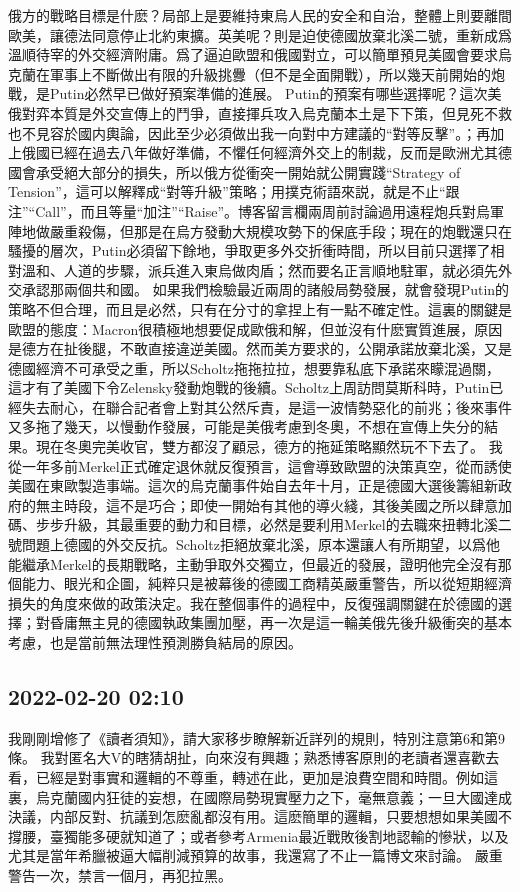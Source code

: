 \documentclass[twocolumn]{ctexart}
\begin{document}
俄方的戰略目標是什麽？局部上是要維持東烏人民的安全和自治，整體上則要離間歐美，讓德法同意停止北約東擴。英美呢？則是迫使德國放棄北溪二號，重新成爲溫順待宰的外交經濟附庸。爲了逼迫歐盟和俄國對立，可以簡單預見美國會要求烏克蘭在軍事上不斷做出有限的升級挑釁（但不是全面開戰），所以幾天前開始的炮戰，是Putin必然早已做好預案準備的進展。
Putin的預案有哪些選擇呢？這次美俄對弈本質是外交宣傳上的鬥爭，直接揮兵攻入烏克蘭本土是下下策，但見死不救也不見容於國内輿論，因此至少必須做出我一向對中方建議的“對等反擊”。；再加上俄國已經在過去八年做好準備，不懼任何經濟外交上的制裁，反而是歐洲尤其德國會承受絕大部分的損失，所以俄方從衝突一開始就公開實踐“Strategy of Tension”，這可以解釋成“對等升級”策略；用撲克術語來説，就是不止“跟注”“Call”，而且等量“加注”“Raise”。博客留言欄兩周前討論過用遠程炮兵對烏軍陣地做嚴重殺傷，但那是在烏方發動大規模攻勢下的保底手段；現在的炮戰還只在騷擾的層次，Putin必須留下餘地，爭取更多外交折衝時間，所以目前只選擇了相對溫和、人道的步驟，派兵進入東烏做肉盾；然而要名正言順地駐軍，就必須先外交承認那兩個共和國。
如果我們檢驗最近兩周的諸般局勢發展，就會發現Putin的策略不但合理，而且是必然，只有在分寸的拿捏上有一點不確定性。這裏的關鍵是歐盟的態度：Macron很積極地想要促成歐俄和解，但並沒有什麽實質進展，原因是德方在扯後腿，不敢直接違逆美國。然而美方要求的，公開承諾放棄北溪，又是德國經濟不可承受之重，所以Scholtz拖拖拉拉，想要靠私底下承諾來矇混過關，這才有了美國下令Zelensky發動炮戰的後續。Scholtz上周訪問莫斯科時，Putin已經失去耐心，在聯合記者會上對其公然斥責，是這一波情勢惡化的前兆；後來事件又多拖了幾天，以慢動作發展，可能是美俄考慮到冬奧，不想在宣傳上失分的結果。現在冬奧完美收官，雙方都沒了顧忌，德方的拖延策略顯然玩不下去了。
我從一年多前Merkel正式確定退休就反復預言，這會導致歐盟的決策真空，從而誘使美國在東歐製造事端。這次的烏克蘭事件始自去年十月，正是德國大選後籌組新政府的無主時段，這不是巧合；即使一開始有其他的導火綫，其後美國之所以肆意加碼、步步升級，其最重要的動力和目標，必然是要利用Merkel的去職來扭轉北溪二號問題上德國的外交反抗。Scholtz拒絕放棄北溪，原本還讓人有所期望，以爲他能繼承Merkel的長期戰略，主動爭取外交獨立，但最近的發展，證明他完全沒有那個能力、眼光和企圖，純粹只是被幕後的德國工商精英嚴重警告，所以從短期經濟損失的角度來做的政策決定。我在整個事件的過程中，反復强調關鍵在於德國的選擇；對昏庸無主見的德國執政集團加壓，再一次是這一輪美俄先後升級衝突的基本考慮，也是當前無法理性預測勝負結局的原因。
\subsection*{2022-02-20 02:10}

我剛剛增修了《讀者須知》，請大家移步瞭解新近詳列的規則，特別注意第6和第9條。
我對匿名大V的瞎猜胡扯，向來沒有興趣；熟悉博客原則的老讀者還喜歡去看，已經是對事實和邏輯的不尊重，轉述在此，更加是浪費空間和時間。例如這裏，烏克蘭國内狂徒的妄想，在國際局勢現實壓力之下，毫無意義；一旦大國達成決議，内部反對、抗議到怎麽亂都沒有用。這麽簡單的邏輯，只要想想如果美國不撐腰，臺獨能多硬就知道了；或者參考Armenia最近戰敗後割地認輸的慘狀，以及尤其是當年希臘被逼大幅削減預算的故事，我還寫了不止一篇博文來討論。
嚴重警告一次，禁言一個月，再犯拉黑。
\end{document}
